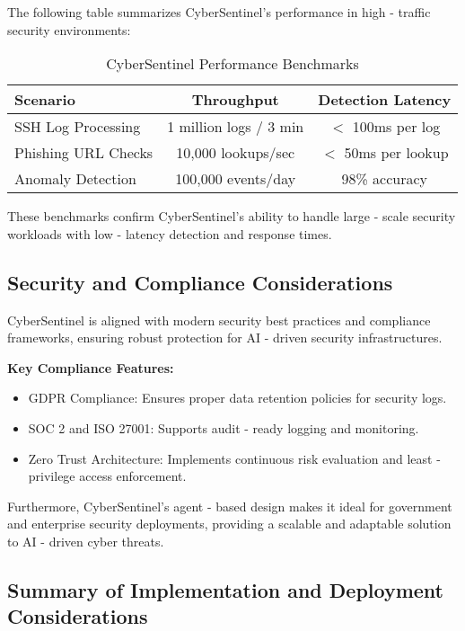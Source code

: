 \documentclass{article}
\begin{document}
The following table summarizes CyberSentinel’s performance in high - traffic security environments:

\begin{table}[h]
    \centering
    \caption{CyberSentinel Performance Benchmarks}
    \renewcommand{\arraystretch}{1.2}
    \begin{tabular}{|l|c|c|}
        \hline
        \textbf{Scenario} & \textbf{Throughput} & \textbf{Detection Latency} \\
        \hline
        SSH Log Processing & 1 million logs / 3 min & $<$ 100ms per log \\
        Phishing URL Checks & 10,000 lookups/sec & $<$ 50ms per lookup \\
        Anomaly Detection & 100,000 events/day & 98\% accuracy \\
        \hline
    \end{tabular}
    \label{tab:performance}
\end{table}

These benchmarks confirm CyberSentinel’s ability to handle large - scale security workloads with low - latency detection and response times.

\subsection{Security and Compliance Considerations}

CyberSentinel is aligned with modern security best practices and compliance frameworks, ensuring robust protection for AI - driven security infrastructures.

\textbf{Key Compliance Features:}
\begin{itemize}
    \item GDPR Compliance: Ensures proper data retention policies for security logs.
    \item SOC 2 and ISO 27001: Supports audit - ready logging and monitoring.
    \item Zero Trust Architecture: Implements continuous risk evaluation and least - privilege access enforcement.
\end{itemize}

Furthermore, CyberSentinel’s agent - based design makes it ideal for government and enterprise security deployments, providing a scalable and adaptable solution to AI - driven cyber threats.

\subsection{Summary of Implementation and Deployment Considerations}
\end{document}
